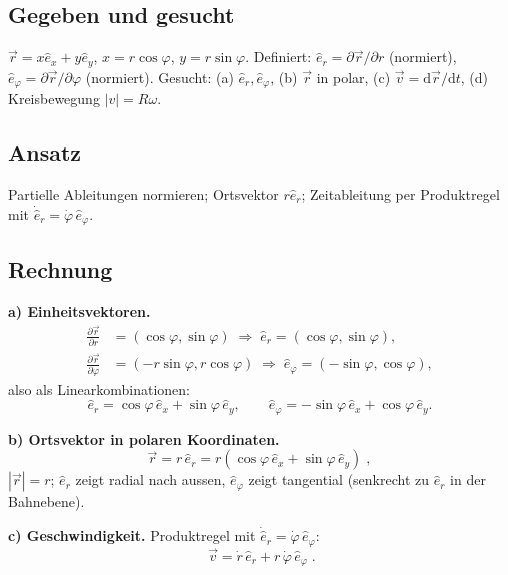 
\subsection*{Gegeben und gesucht}
$\vec r=x\hat e_x+y\hat e_y$, $x=r\cos\varphi$, $y=r\sin\varphi$.
Definiert: $\hat e_r=\partial\vec r/\partial r$ (normiert),
$\hat e_\varphi=\partial\vec r/\partial\varphi$ (normiert).
Gesucht: (a) $\hat e_r,\hat e_\varphi$, (b) $\vec r$ in polar,
(c) $\vec v=\mathrm d\vec r/\mathrm dt$, (d) Kreisbewegung $|v|=R\omega$.

\subsection*{Ansatz}
Partielle Ableitungen normieren; Ortsvektor $r\hat e_r$; Zeitableitung
per Produktregel mit $\dot{\hat e}_r=\dot\varphi\,\hat e_\varphi$.

\subsection*{Rechnung}
\textbf{a) Einheitsvektoren.}
\begin{align}
  \frac{\partial\vec r}{\partial r}&=(\cos\varphi,\sin\varphi)
   \;\Rightarrow\;\hat e_r=(\cos\varphi,\sin\varphi),\\
  \frac{\partial\vec r}{\partial\varphi}&=(-r\sin\varphi,r\cos\varphi)
   \;\Rightarrow\;\hat e_\varphi=(-\sin\varphi,\cos\varphi),
\end{align}
also als Linearkombinationen:
\begin{equation}
  \hat e_r=\cos\varphi\,\hat e_x+\sin\varphi\,\hat e_y,\qquad
  \hat e_\varphi=-\sin\varphi\,\hat e_x+\cos\varphi\,\hat e_y.
\end{equation}

\textbf{b) Ortsvektor in polaren Koordinaten.}
\begin{equation}
  \vec r=r\,\hat e_r=r(\cos\varphi\,\hat e_x+\sin\varphi\,\hat e_y)\;,
\end{equation}
$|\vec r|=r$; $\hat e_r$ zeigt radial nach aussen, $\hat e_\varphi$ zeigt
tangential (senkrecht zu $\hat e_r$ in der Bahnebene).

\textbf{c) Geschwindigkeit.} Produktregel mit $\dot{\hat e}_r=\dot\varphi\,\hat e_\varphi$:
\begin{equation}
  \boxed{\;\vec v=\dot r\,\hat e_r+r\,\dot\varphi\,\hat e_\varphi\;}.
\end{equation}

